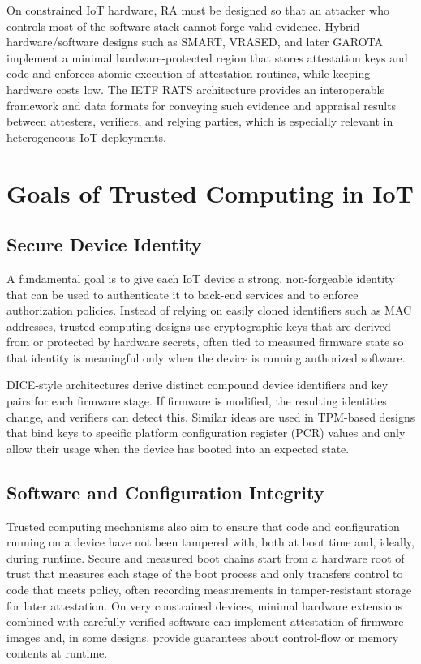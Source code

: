 \documentclass[conference,11pt,a4paper]{IEEEtran}
\begin{document}
On constrained IoT hardware, RA must be designed so that an attacker who controls most of the software stack cannot forge valid evidence. Hybrid hardware/software designs such as SMART, VRASED, and later GAROTA implement a minimal hardware-protected region that stores attestation keys and code and enforces atomic execution of attestation routines, while keeping hardware costs low.\cite{root_of_trust_lowend,vRased_usenix} The IETF RATS architecture provides an interoperable framework and data formats for conveying such evidence and appraisal results between attesters, verifiers, and relying parties, which is especially relevant in heterogeneous IoT deployments.\cite{rats_arch}

\section{Goals of Trusted Computing in IoT}
\label{sec:goals}

\subsection{Secure Device Identity}
A fundamental goal is to give each IoT device a strong, non-forgeable identity that can be used to authenticate it to back-end services and to enforce authorization policies. Instead of relying on easily cloned identifiers such as MAC addresses, trusted computing designs use cryptographic keys that are derived from or protected by hardware secrets, often tied to measured firmware state so that identity is meaningful only when the device is running authorized software.

DICE-style architectures derive distinct compound device identifiers and key pairs for each firmware stage. If firmware is modified, the resulting identities change, and verifiers can detect this. Similar ideas are used in TPM-based designs that bind keys to specific platform configuration register (PCR) values and only allow their usage when the device has booted into an expected state.\cite{tcg_tpm_iot}

\subsection{Software and Configuration Integrity}
Trusted computing mechanisms also aim to ensure that code and configuration running on a device have not been tampered with, both at boot time and, ideally, during runtime.\cite{ra_survey,resource_constrained} Secure and measured boot chains start from a hardware root of trust that measures each stage of the boot process and only transfers control to code that meets policy, often recording measurements in tamper-resistant storage for later attestation.\cite{root_of_trust_lowend} On very constrained devices, minimal hardware extensions combined with carefully verified software can implement attestation of firmware images and, in some designs, provide guarantees about control-flow or memory contents at runtime.\cite{root_of_trust_lowend,vRased_usenix}
\end{document}

